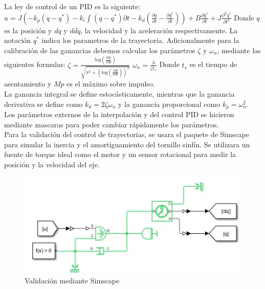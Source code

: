 La ley de control de un PID es la siguiente:
$u = J\left(-k_p(q-q^{*})-k_i\int(q-q^{*})\partial t-k_d\left(\frac{\partial q}{\partial t}-\frac{\partial q^*}{\partial t}\right)\right)+B\frac{\partial q^*}{\partial t}+J\frac{\partial^2 q^*}{\partial t^2}$
Donde $q$ es la posición y $dq$ y $ddq$, la velocidad y la aceleración respectivamente. La notación $q^*$ indica los parametros de la trayectoria.
Adicionalmente para la calibración de las ganancias debemos calcular los parámetros $\zeta$ y $\omega_n$, mediante las siguientes formulas:
$\zeta = \frac{log\left(\frac{Mp}{100}\right)}{\sqrt{\pi^{2}+\left(log\left(\frac{Mp}{100}\right) \right)^{2}}}$
$\omega_n = \frac{3}{\zeta t_s}$
Donde $t_s$ es el tiempo de asentamiento y $Mp$ es el máximo sobre impulso. \\
La ganancia integral se define estocásticamente, mientras que la ganancia derivativa se define como $k_d = 2\zeta\omega_n$ y la ganancia proporcional como $k_p = \omega_n^2$. \\
Los parámetros externos de la interpolación y del control PID se hicieron mediante mascaras para poder cambiar rápidamente los parámetros. \\
Para la validación del control de trayectorias, se usara el paquete de Simscape para simular la inercia y el amortiguamiento del tornillo sinfín. Se utilizara un fuente de torque ideal como el motor y un sensor rotacional para medir la posición y la velocidad del eje. 
\begin{figure}[!htb]
    \centering
    \includegraphics[width=1\textwidth]{imagenes/Simscape.jpg}
    \caption{\footnotesize Validación mediante Simscape}
    \label{fig:Simscape}
\end{figure}
